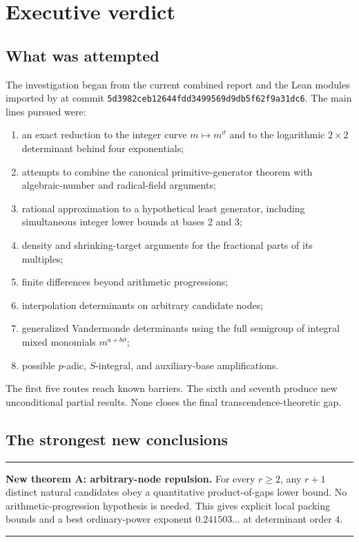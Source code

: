 \documentclass[11pt,oneside]{article}
\theoremstyle{definition}
\theoremstyle{remark}
\newcommand{\thetaq}{\vartheta}
\newcommand{\lean}[1]{\texttt{\detokenize{#1}}}
\newcommand{\commit}[1]{\texttt{#1}}
\newenvironment{resultbox}
{\begin{center}\begin{minipage}{0.94\textwidth}\hrule\vspace{0.45em}}
{\vspace{0.35em}\hrule\end{minipage}\end{center}}
\begin{document}
\tableofcontents
\clearpage
{}

\section{Executive verdict}
\label{sec:executive}

\subsection{What was attempted}

The investigation began from the current combined report and the Lean modules imported by
\lean{ExponentialIdentities.lean} at commit
\commit{5d3982ceb12644fdd3499569d9db5f62f9a31dc6}.  The main lines pursued were:

\begin{enumerate}
\item an exact reduction to the integer curve $m\mapsto m^{\thetaq}$ and to the logarithmic
$2\times2$ determinant behind four exponentials;
\item attempts to combine the canonical primitive-generator theorem with algebraic-number
and radical-field arguments;
\item rational approximation to a hypothetical least generator, including simultaneous
integer lower bounds at bases $2$ and $3$;
\item density and shrinking-target arguments for the fractional parts of its multiples;
\item finite differences beyond arithmetic progressions;
\item interpolation determinants on arbitrary candidate nodes;
\item generalized Vandermonde determinants using the full semigroup of integral mixed
monomials $m^{a+b\thetaq}$;
\item possible $p$-adic, $S$-integral, and auxiliary-base amplifications.
\end{enumerate}

The first five routes reach known barriers.  The sixth and seventh produce new unconditional
partial results.  None closes the final transcendence-theoretic gap.

\subsection{The strongest new conclusions}

\begin{resultbox}
\textbf{New theorem A: arbitrary-node repulsion.}
For every $r\ge2$, any $r+1$ distinct natural candidates obey a quantitative product-of-gaps
lower bound.  No arithmetic-progression hypothesis is needed.  This gives explicit local
packing bounds and a best ordinary-power exponent $0.241503\ldots$ at determinant order $4$.
\end{resultbox}
\end{document}
